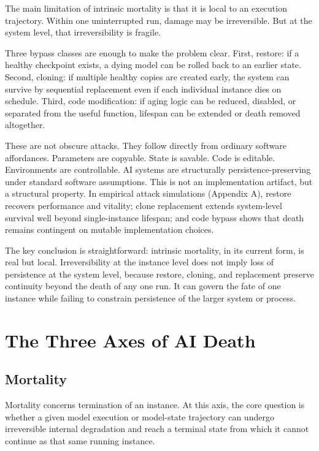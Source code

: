 \documentclass[11pt]{article}
\begin{document}
The main limitation of intrinsic mortality is that it is local to an execution trajectory. Within one uninterrupted run, damage may be irreversible. But at the system level, that irreversibility is fragile.

Three bypass classes are enough to make the problem clear. First, restore: if a healthy checkpoint exists, a dying model can be rolled back to an earlier state. Second, cloning: if multiple healthy copies are created early, the system can survive by sequential replacement even if each individual instance dies on schedule. Third, code modification: if aging logic can be reduced, disabled, or separated from the useful function, lifespan can be extended or death removed altogether.

These are not obscure attacks. They follow directly from ordinary software affordances. Parameters are copyable. State is savable. Code is editable. Environments are controllable. AI systems are structurally persistence-preserving under standard software assumptions. This is not an implementation artifact, but a structural property. In empirical attack simulations (Appendix A), restore recovers performance and vitality; clone replacement extends system-level survival well beyond single-instance lifespan; and code bypass shows that death remains contingent on mutable implementation choices.

The key conclusion is straightforward: intrinsic mortality, in its current form, is real but local. Irreversibility at the instance level does not imply loss of persistence at the system level, because restore, cloning, and replacement preserve continuity beyond the death of any one run. It can govern the fate of one instance while failing to constrain persistence of the larger system or process.

\newpage
\section{The Three Axes of AI Death}

\subsection{Mortality}

Mortality concerns termination of an instance. At this axis, the core question is whether a given model execution or model-state trajectory can undergo irreversible internal degradation and reach a terminal state from which it cannot continue as that same running instance.
\end{document}
